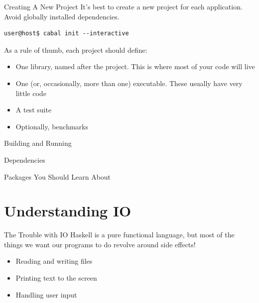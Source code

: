 \documentclass[10pt, presentation, colorlinks]{beamer}
\begin{document}
\begin{frame}[label={sec:orgfd16029},fragile]{Creating A New Project}
 It's best to create a new project for each application. Avoid globally installed dependencies.
\pause
\bigskip
\begin{verbatim}
user@host$ cabal init --interactive
\end{verbatim}
\pause
As a rule of thumb, each project should define:
\bigskip
\begin{itemize}
\item One library, named after the project. This is where most of your code will live
\item One (or, occasionally, more than one) executable. These usually have very little code
\item A test suite
\item Optionally, benchmarks
\end{itemize}
\end{frame}

\begin{frame}[label={sec:org98243b7}]{Building and Running}
\end{frame}

\begin{frame}[label={sec:org0e7e273}]{Dependencies}
\end{frame}

\begin{frame}[label={sec:org4d5cc68}]{Packages You Should Learn About}
\end{frame}

\section{Understanding IO}
\label{sec:orgc42796f}

\begin{frame}[label={sec:orge6e9afc}]{The Trouble with IO}
Haskell is a \alert{pure functional} language, but most of the things we want our programs to do revolve around \alert{side effects}!

\bigskip

\pause
\begin{itemize}
\item Reading and writing files
\end{itemize}
\pause
\begin{itemize}
\item Printing text to the screen
\end{itemize}
\pause
\begin{itemize}
\item Handling user input
\end{itemize}
\end{frame}
\end{document}
